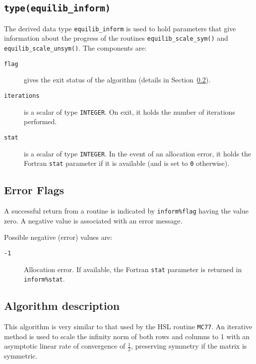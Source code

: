 \subsection{\texttt{type(equilib\_inform)}} \label{scaling:type:equilib_inform}

The derived data type \texttt{equilib\_inform} is used to hold parameters that
give information about the progress of the routines
\texttt{equilib\_scale\_sym()} and \texttt{equilib\_scale\_unsym()}. The components are:

\begin{description}

\item[\texttt{flag}] gives the exit status of the algorithm (details in Section~\ref{scaling:errors:equilib}).

\item[\texttt{iterations}] is a scalar of type \texttt{INTEGER}. On exit, it
   holds the number of iterations performed.

\item[\texttt{stat}] is a scalar of type \texttt{INTEGER}. In the event of an allocation error, it holds the Fortran \texttt{stat} parameter if it is available (and is set to \texttt{0} otherwise).

\end{description}

\subsection{Error Flags} \label{scaling:errors:equilib}
A successful return from a routine is indicated by \texttt{inform\%flag} having the value zero. A negative value is associated with an error message.

Possible negative (error) values are:
\begin{description}
\item[\texttt{-1}] Allocation error. If available, the Fortran \texttt{stat} parameter is returned in \texttt{inform\%stat}.
\end{description}

\subsection{Algorithm description}

This algorithm is very similar to that used by the HSL routine \texttt{MC77}.
An iterative method
is used to scale the infinity norm of both rows and columns to 1 with an asymptotic linear rate of convergence of $\frac{1}{2}$, preserving symmetry if the matrix is symmetric.

